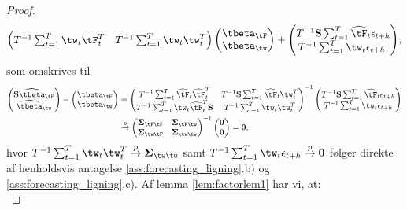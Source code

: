 \begin{proof}
\begin{align*}
{\begin{pmatrix}
T^{-1} \sum_{t=1}^T \tw_t \tF_t^T & T^{-1} \sum_{t=1}^T \tw_t \tw_t^T
\end{pmatrix} 
\begin{pmatrix}
\tbeta_{\tF} \\ \tbeta_{\tw}
\end{pmatrix}  + \begin{pmatrix}
T^{-1} \mathbf{S} \sum_{t=1}^T\widehat{\tF}_t \epsilon_{t+h} \\ T^{-1} \sum_{t=1}^T \tw_t \epsilon_{t+h},
\end{pmatrix} },
\end{align*}
som omskrives til
\begin{align*}
\begin{pmatrix}
\mathbf{S} \widehat{\tbeta}_{\tF} \\ \widehat{\tbeta}_{\tw}
\end{pmatrix} - \begin{pmatrix}
\tbeta_{\tF} \\ \tbeta_{\tw}
\end{pmatrix} &= \begin{pmatrix}
T^{-1} \sum_{t=1}^T \widehat{\tF}_t \widehat{\tF}_t^T & T^{-1} \mathbf{S} \sum_{t=1}^T \widehat{\tF}_t \tw_t^T \\
T^{-1} \sum_{t=1}^T \tw_t \widehat{\tF}_t^T \mathbf{S} & T^{-1} \sum_{t=1}^T \tw_t \tw_t^T
\end{pmatrix}^{-1} \begin{pmatrix}
T^{-1} \mathbf{S} \sum_{t=1}^T \widehat{\tF}_t \epsilon_{t+h} \\
T^{-1} \sum_{t=1}^T \tw_t \epsilon_{t+h}
\end{pmatrix} \\
&\overset{p}{\rightarrow} \begin{pmatrix}
\boldsymbol{\Sigma}_{\tF \tF} & \boldsymbol{\Sigma}_{\tF \tw} \\ \boldsymbol{\Sigma}_{\tw \tF} & \boldsymbol{\Sigma}_{\tw \tw}   
\end{pmatrix}^{-1} \begin{pmatrix}
\mathbf{0} \\ \mathbf{0}
\end{pmatrix} = \mathbf{0},
\end{align*}
hvor 
\(T^{-1} \sum_{t=1}^T \tw_t \tw_t^T \overset{p}{\rightarrow} \boldsymbol{\Sigma}_{\tw \tw}\) samt \(T^{-1} \sum_{t=1}^T \tw_t \epsilon_{t+h} \overset{p}{\rightarrow} \mathbf{0}\) følger direkte af henholdsvis antagelse \ref{ass:forecasting_ligning}.b) og \ref{ass:forecasting_ligning}.c).
Af lemma \ref{lem:factorlem1} har vi, at: \\

\end{proof}
